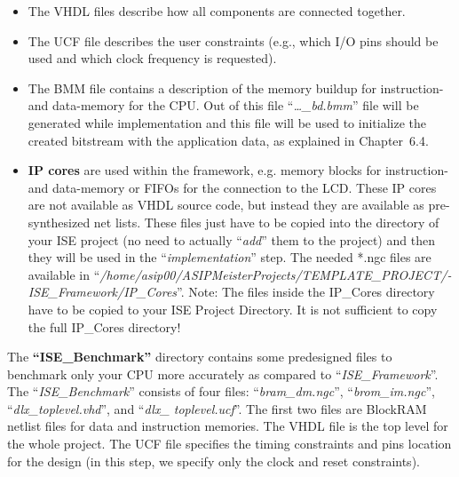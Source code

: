\begin{itemize}
\item
  The VHDL files describe how all components are connected together.
\item
  The UCF file describes the user constraints (e.g., which I/O pins
  should be used and which clock frequency is requested).
\item
  The BMM file contains a description of the memory buildup for
  instruction- and data-memory for the CPU. Out of this file
  ``\emph{\ldots\_bd.bmm}'' file will be generated while implementation
  and this file will be used to initialize the created bitstream with
  the application data, as explained in Chapter~6.4.
\item
  \textbf{IP cores} are used within the framework, e.g. memory blocks
  for instruction- and data-memory or FIFOs for the connection to the
  LCD. These IP cores are not available as VHDL source code, but instead
  they are available as pre-synthesized net lists. These files just have
  to be copied into the directory of your ISE project (no need to
  actually ``\emph{add}'' them to the project) and then they will be
  used in the ``\emph{implementation}'' step. The needed *.ngc files are
  available in
  ``\emph{/home/asip00/­ASIPMeisterProjects/­TEMPLATE\_PROJECT/­ISE\_Framework/­IP\_­Cores}''.
  Note: The files {inside} the IP\_Cores directory have to be copied to
  your ISE Project Directory. It is not sufficient to copy the full
  IP\_Cores directory!
\end{itemize}

The \textbf{``ISE\_}\textbf{Benchmark''} directory contains some
predesigned files to benchmark only your CPU more accurately as compared
to ``\emph{ISE\_Framework}''. The ``\emph{ISE\_Benchmark}'' consists of
four files: ``\emph{bram\_dm.ngc}'', ``\emph{brom\_im.ngc}'',
``\emph{dlx\_}\emph{toplevel.vhd}'', and ``\emph{dlx\_ toplevel.ucf}''.
The first two files are BlockRAM netlist files for data and instruction
memories. The VHDL file is the top level for the whole project. The UCF
file specifies the timing constraints and pins location for the design
(in this step, we specify only the clock and reset constraints).

